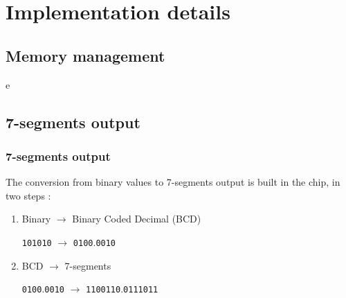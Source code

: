 \documentclass[slidestop]{beamer}
\begin{document}
\section{Implementation details}

\subsection{Memory management}

\begin{frame}
e
\end{frame}

\subsection{7-segments output}

\begin{frame}
\frametitle{7-segments output}
The conversion from binary values to 7-segments output is built in the chip, in two steps :
\begin{enumerate}
    \item Binary $\rightarrow$ Binary Coded Decimal (BCD)
        
          \texttt{101010} $\rightarrow$ \texttt{0100}.\texttt{0010}
    \item BCD $\rightarrow$ 7-segments

        \texttt{0100}.\texttt{0010} $\rightarrow$ \texttt{1100110}.\texttt{0111011}
\end{enumerate}
\end{frame}
\end{document}
